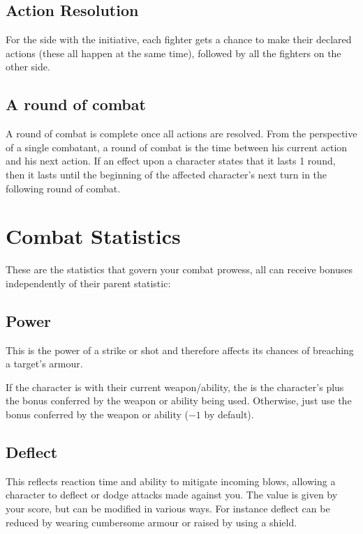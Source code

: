 \documentclass[a4paper,10pt,oneside]{book}
\newcommand{\dicenoprof}{-1}
\newcommand{\textlf}[1]{\textbf{\titlecap{#1}}}
\begin{document}
\subsection{Action Resolution}
For the side with the initiative, each fighter gets a chance to make their declared actions (these all happen at the same time), followed by all the fighters on the other side.  

\subsection{A round of combat}
A round of combat is complete once all actions are resolved. From the perspective of a single combatant, a round of combat is the time between his current action and his next action. If an effect upon a character states that it lasts 1 round, then it lasts until the beginning of the affected character's next turn in the following round of combat.


\section{Combat Statistics}
\label{sec:comstat}
These are the statistics that govern your combat prowess, all can receive bonuses independently of their parent statistic:

\subsection{Power}
This is the power of a strike or shot and therefore affects its chances of breaching a target's armour. 

If the character is \textlf{proficient} with their current weapon/ability, the \textlf{Power} is the character's \textlf{might} plus the bonus conferred by the weapon or ability being used. Otherwise, just use the bonus conferred by the weapon or ability ($\dicenoprof$ by default).

\subsection{Deflect}
This reflects reaction time and ability to mitigate incoming blows, allowing a character to deflect or dodge attacks made against you. The value is given by your \textlf{Cunning} score, but can be modified in various ways. For instance deflect can be reduced by wearing cumbersome armour or raised by using a shield.
\end{document}
